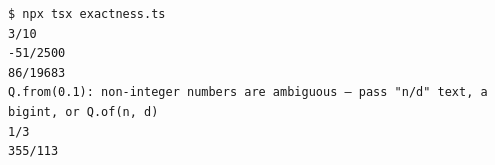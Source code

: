 \begin{Verbatim}[fontsize=\small,frame=leftline,rulecolor=\color{accentmid},framesep=3mm,xleftmargin=3mm]
$ npx tsx exactness.ts
3/10
-51/2500
86/19683
Q.from(0.1): non-integer numbers are ambiguous — pass "n/d" text, a bigint, or Q.of(n, d)
1/3
355/113
\end{Verbatim}
